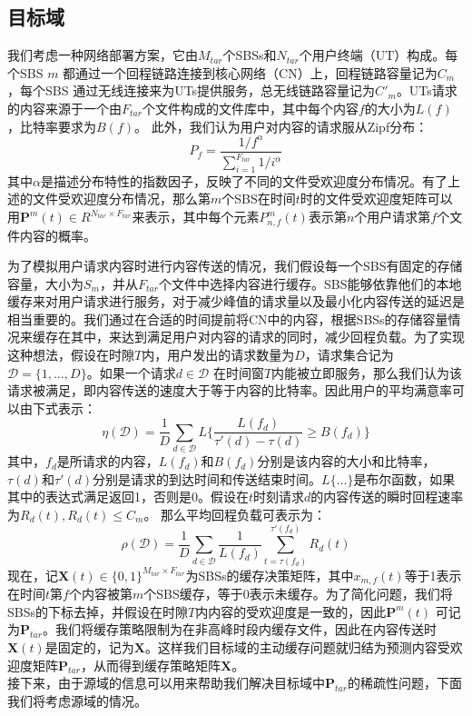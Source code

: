 \documentclass[bachelor]{seuthesis} %
\begin{document}
\begin{Main}
\subsection{目标域}
我们考虑一种网络部署方案，它由$M_{tar}$个SBSs和$N_{tar}$个用户终端（UT）构成。每个SBS $m$ 都通过一个回程链路连接到核心网络（CN）上，回程链路容量记为$C_m$，每个SBS 通过无线连接来为UTs提供服务，总无线链路容量记为$C'_m$。UTs请求的内容来源于一个由$F_{tar}$个文件构成的文件库中，其中每个内容$f$的大小为$L(f)$，比特率要求为$B(f)$。 此外，我们认为用户对内容的请求服从Zipf分布\cite{breslau1999web}：
\begin{equation}\label{Zipf}
P_f=\frac{1/f^\alpha}{\sum_{i=1}^{F_{tar}}1/i^\alpha}
\end{equation}
其中$\alpha$是描述分布特性的指数因子，反映了不同的文件受欢迎度分布情况。有了上述的文件受欢迎度分布情况，那么第$m$个SBS在时间$t$时的文件受欢迎度矩阵可以用$\textbf{P}^m(t)\in R^{N_{tar}\times F_{tar}}$来表示，其中每个元素$P_{n,f}^m(t)$表示第$n$个用户请求第$f$个文件内容的概率。\par
为了模拟用户请求内容时进行内容传送的情况，我们假设每一个SBS有固定的存储容量，大小为$S_m$，并从$F_{tar}$个文件中选择内容进行缓存。SBS能够依靠他们的本地缓存来对用户请求进行服务，对于减少峰值的请求量以及最小化内容传送的延迟是相当重要的。我们通过在合适的时间提前将CN中的内容，根据SBSs的存储容量情况来缓存在其中，来达到满足用户对内容的请求的同时，减少回程负载。为了实现这种想法，假设在时隙$T$内，用户发出的请求数量为$D$，请求集合记为$\mathcal{D}=\{1,\dots,D\}$。如果一个请求$d\in\mathcal{D}$ 在时间窗$T$内能被立即服务，那么我们认为该请求被满足，即内容传送的速度大于等于内容的比特率。因此用户的平均满意率可以由下式表示：
\begin{equation}
\eta(\mathcal{D})=\frac{1}{D}\sum_{d\in\mathcal{D}}L\{\frac{L(f_d)}{\tau'(d)-\tau(d)}\geq B(f_d)\}
\end{equation}
其中，$f_d$是所请求的内容，$L(f_d)$和$B(f_d)$分别是该内容的大小和比特率，$\tau(d)$和$\tau'(d)$分别是请求的到达时间和传送结束时间。$L\{\dots\}$是布尔函数，如果其中的表达式满足返回1，否则是0。假设在$t$时刻请求$d$的内容传送的瞬时回程速率为$R_d(t),R_d(t)\leq C_m$。 那么平均回程负载可表示为：
\begin{equation}
\rho(\mathcal{D})=\frac{1}{D}\sum_{d\in\mathcal{D}}\frac{1}{L(f_d)}\sum_{t=\tau(f_d)}^{\tau'(f_d)}R_d(t)
\end{equation}
现在，记$\textbf{X}(t)\in\{0,1\}^{M_{tar}\times F_{tar}}$为SBSs的缓存决策矩阵，其中$x_{m,f}(t)$等于1表示在时间$t$第$f$个内容被第$m$个SBS缓存，等于0表示未缓存。为了简化问题，我们将SBSs的下标去掉，并假设在时隙$T$内内容的受欢迎度是一致的，因此$\textbf{P}^m(t)$ 可记为$\textbf{P}_{tar}$。我们将缓存策略限制为在非高峰时段内缓存文件，因此在内容传送时$\textbf{X}(t)$是固定的，记为$\textbf{X}$。这样我们目标域的主动缓存问题就归结为预测内容受欢迎度矩阵$\textbf{P}_{tar}$，从而得到缓存策略矩阵$\textbf{X}$。\\
接下来，由于源域的信息可以用来帮助我们解决目标域中$\textbf{P}_{tar}$的稀疏性问题，下面我们将考虑源域的情况。

\end{Main}
\end{document}
